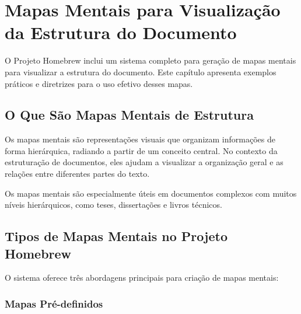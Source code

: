 \section{Mapas Mentais para Visualização da Estrutura do Documento}

O Projeto Homebrew inclui um sistema completo para geração de mapas mentais para visualizar a estrutura do documento. Este capítulo apresenta exemplos práticos e diretrizes para o uso efetivo desses mapas.

\subsection{O Que São Mapas Mentais de Estrutura}

Os mapas mentais são representações visuais que organizam informações de forma hierárquica, radiando a partir de um conceito central. No contexto da estruturação de documentos, eles ajudam a visualizar a organização geral e as relações entre diferentes partes do texto.


\begin{dmnote}
Os mapas mentais são especialmente úteis em documentos complexos com muitos níveis hierárquicos, como teses, dissertações e livros técnicos.
\end{dmnote}

\subsection{Tipos de Mapas Mentais no Projeto Homebrew}

O sistema oferece três abordagens principais para criação de mapas mentais:

\begin{itemize}
\end{itemize}

\subsubsection{Mapas Pré-definidos}


